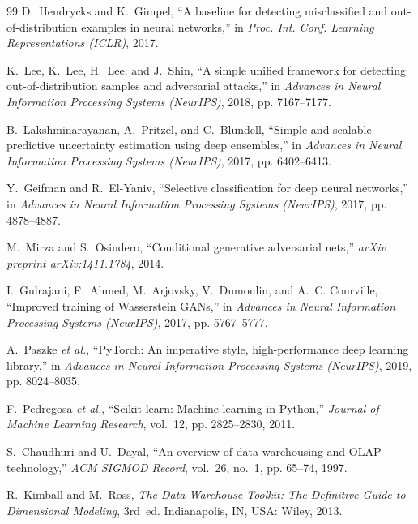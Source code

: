\documentclass[conference]{IEEEtran}
\begin{document}
\begin{thebibliography}{99}
D.~Hendrycks and K.~Gimpel, ``A baseline for detecting misclassified and out-of-distribution examples in neural networks,'' in \textit{Proc. Int. Conf. Learning Representations (ICLR)}, 2017.

K.~Lee, K.~Lee, H.~Lee, and J.~Shin, ``A simple unified framework for detecting out-of-distribution samples and adversarial attacks,'' in \textit{Advances in Neural Information Processing Systems (NeurIPS)}, 2018, pp. 7167--7177.

B.~Lakshminarayanan, A.~Pritzel, and C.~Blundell, ``Simple and scalable predictive uncertainty estimation using deep ensembles,'' in \textit{Advances in Neural Information Processing Systems (NeurIPS)}, 2017, pp. 6402--6413.

Y.~Geifman and R.~El-Yaniv, ``Selective classification for deep neural networks,'' in \textit{Advances in Neural Information Processing Systems (NeurIPS)}, 2017, pp. 4878--4887.

M.~Mirza and S.~Osindero, ``Conditional generative adversarial nets,'' \textit{arXiv preprint arXiv:1411.1784}, 2014.

I.~Gulrajani, F.~Ahmed, M.~Arjovsky, V.~Dumoulin, and A.~C. Courville, ``Improved training of Wasserstein GANs,'' in \textit{Advances in Neural Information Processing Systems (NeurIPS)}, 2017, pp. 5767--5777.

A.~Paszke \textit{et al.}, ``PyTorch: An imperative style, high-performance deep learning library,'' in \textit{Advances in Neural Information Processing Systems (NeurIPS)}, 2019, pp. 8024--8035.

F.~Pedregosa \textit{et al.}, ``Scikit-learn: Machine learning in Python,'' \textit{Journal of Machine Learning Research}, vol.~12, pp. 2825--2830, 2011.

S.~Chaudhuri and U.~Dayal, ``An overview of data warehousing and OLAP technology,'' \textit{ACM SIGMOD Record}, vol.~26, no.~1, pp. 65--74, 1997.

R.~Kimball and M.~Ross, \textit{The Data Warehouse Toolkit: The Definitive Guide to Dimensional Modeling}, 3rd~ed. Indianapolis, IN, USA: Wiley, 2013.

\end{thebibliography}
\end{document}
